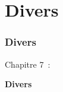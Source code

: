 %

\section{Divers}
\begin{frame}[fragile]
	\frametitle{Divers}

	\begin{center}\huge{Chapitre 7~:}\end{center}
	\begin{center}\huge{\color{typo3darkgrey}\textbf{Divers}}\end{center}

\end{frame}

